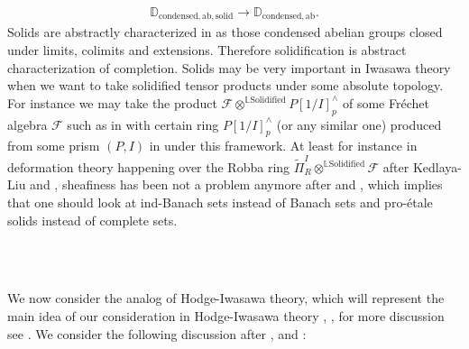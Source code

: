 \documentclass[11pt]{report}
\begin{document}
\begin{itemize}
\begin{align}
\mathbb{D}_{\mathrm{condensed},\mathrm{ab},\mathrm{solid}}\rightarrow \mathbb{D}_{\mathrm{condensed},\mathrm{ab}}.
\end{align}
Solids are abstractly characterized in \cite{CS1} as those condensed abelian groups closed under limits, colimits and extensions. Therefore solidification is abstract characterization of completion. Solids may be very important in Iwasawa theory when we want to take solidified tensor products under some absolute topology. For instance we may take the product $\mathcal{F}\otimes^{\mathbb{L}\mathrm{Solidified}}P[1/I]^\wedge_p$ of some Fr\'echet algebra $\mathcal{F}$ such as in \cite{ST} with certain ring $P[1/I]^\wedge_p$ (or any similar one) produced from some prism $(P,I)$ in \cite{BS} under this framework. At least for instance in deformation theory happening over the Robba ring $\widetilde{\Pi}^I_{R}\otimes^{\mathbb{L}\mathrm{Solidified}}\mathcal{F}$ after Kedlaya-Liu \cite{KL1} and \cite{KL2}, sheafiness has been not a problem anymore after \cite{BK} and \cite{CS2}, which implies that one should look at ind-Banach sets instead of Banach sets and pro-\'etale solids instead of complete sets.


 
	
\end{itemize}


	


\





\\

\indent We now consider the analog of Hodge-Iwasawa theory, which will represent the main idea of our consideration in Hodge-Iwasawa theory \cite{T1}, \cite{T2}, for more discussion see \cite[Chapter 1]{T7}. We consider the following discussion after \cite{BS}, \cite{BS3} and \cite{3Sch2}:
\end{document}
